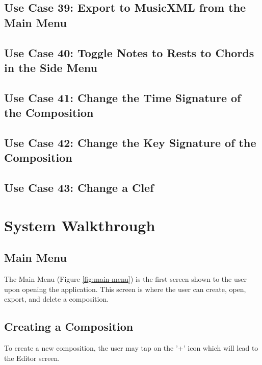   \section{Use Case 39: Export to MusicXML from the Main Menu}


  \section{Use Case 40: Toggle Notes to Rests to Chords in the Side Menu}


  \section{Use Case 41: Change the Time Signature of the Composition}


  \section{Use Case 42: Change the Key Signature of the Composition}


  \section{Use Case 43: Change a Clef}


\chapter{System Walkthrough}

\section{Main Menu}
The Main Menu (Figure \ref{fig:main-menu}) is the first screen shown to the user upon opening the application. This screen is where the user can create, open, export, and delete a composition. 

\section{Creating a Composition}
To create a new composition, the user may tap on the '+' icon which will lead to the Editor screen. 

